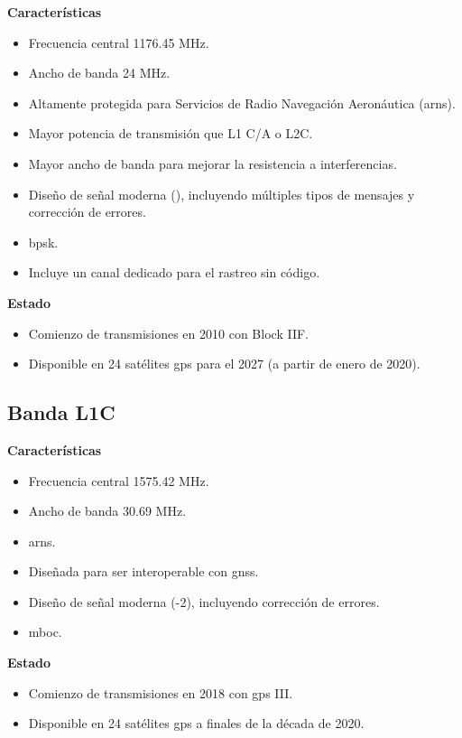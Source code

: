 \begin{justify}
    \textbf{Características}
    \begin{itemize}
        \item Frecuencia central 1176.45 MHz.
        \item Ancho de banda 24 MHz.
        \item Altamente protegida para Servicios de Radio Navegación Aeronáutica (\gls{arns}).
        \item Mayor potencia de transmisión que L1 C/A o L2C.
        \item Mayor ancho de banda para mejorar la resistencia a interferencias.
        \item Diseño de señal moderna (), incluyendo múltiples tipos de mensajes y corrección de errores.
        \item \gls{bpsk}.
        \item Incluye un canal dedicado para el rastreo sin código.
    \end{itemize}

    \textbf{Estado}
    \begin{itemize}
        \item Comienzo de transmisiones en 2010 con Block IIF.
        \item Disponible en 24 satélites \gls{gps} para el 2027 (a partir de enero de 2020).
    \end{itemize}
\end{justify}

\subsection{Banda L1C}

\begin{justify}
    \textbf{Características}
    \begin{itemize}[itemsep=2pt]
        \item Frecuencia central 1575.42 MHz.
        \item Ancho de banda 30.69 MHz.
        \item \gls{arns}.
        \item Diseñada para ser interoperable con \gls{gnss}.
        \item Diseño de señal moderna (-2), incluyendo corrección de errores.
        \item \gls{mboc}.\\
    \end{itemize}

    \noindent\textbf{Estado}
    \begin{itemize}[itemsep=2pt]
        \item Comienzo de transmisiones en 2018 con \gls{gps} III.
        \item Disponible en 24 satélites \gls{gps} a finales de la década de 2020.
    \end{itemize}
\end{justify}